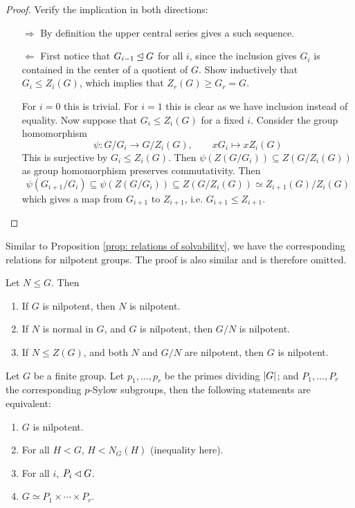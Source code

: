 \documentclass{article}
\begin{document}
\begin{proof}
    Verify the implication in both directions:
    \begin{enumerate}
        \item[$\Rightarrow$] By definition the upper central series gives a such sequence.
        \item[$\Leftarrow$] First notice that $G_{i-1} \unlhd G$ for all $i$, since the inclusion gives $G_i$ is contained in the center of a quotient of $G$. Show inductively that $G_i \leq Z_i(G)$, which implies that $Z_r(G) \geq G_r = G$.
        
        For $i = 0$ this is trivial. For $i = 1$ this is clear as we have inclusion instead of equality. Now suppose that $G_i \leq Z_i(G)$ for a fixed $i$. Consider the group homomorphism
        \[
            \psi: G/G_i \to G/Z_i(G), \qquad x G_i \mapsto x Z_i(G)
        \]
        This is surjective by $G_i \leq Z_i(G)$. Then $\psi(Z(G/G_i)) \subseteq Z(G/Z_i(G))$ as group homomorphism preserves commutativity. Then
        \[
            \psi(G_{i+1}/G_i) \subseteq \psi(Z(G/G_i)) \subseteq Z(G/Z_i(G)) \simeq Z_{i+1}(G)/Z_i(G)
        \]
        which gives a map from $G_{i+1}$ to $Z_{i+1}$, i.e. $G_{i+1} \leq Z_{i+1}$.
    \end{enumerate}
\end{proof}

Similar to Proposition \ref{prop: relations of solvability}, we have the corresponding relations for nilpotent groups. The proof is also similar and is therefore omitted.

\begin{proposition}\label{prop: relations of nilpotent}
    Let $N \leq G$. Then
    \begin{enumerate}[label=\roman*)]
        \item If $G$ is nilpotent, then $N$ is nilpotent. 
        \item If $N$ is normal in $G$, and $G$ is nilpotent, then $G/N$ is nilpotent.
        \item If $N \leq Z(G)$, and both $N$ and $G/N$ are nilpotent, then $G$ is nilpotent.
    \end{enumerate}
\end{proposition}

\begin{theorem}
    Let $G$ be a finite group. Let $p_1, \dots, p_r$ be the primes dividing $\left|G\right|$; and $P_1, \dots, P_r$ the corresponding $p$-Sylow subgroups, then the following statements are equivalent:
    \begin{enumerate}[label=\arabic*)]
        \item $G$ is nilpotent.
        \item For all $H < G$, $H < N_G(H)$ (inequality here).
        \item For all $i$, $P_i \lhd G$.
        \item $G \simeq P_1 \times \cdots \times P_r$.
    \end{enumerate}
\end{theorem}
\end{document}
